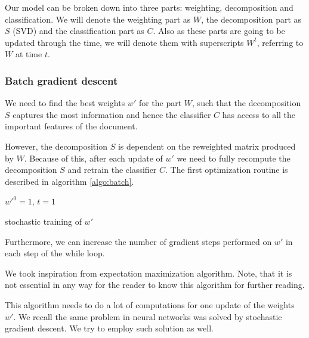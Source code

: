     Our model can be broken down into three parts: weighting, decomposition and classification.
    We will denote the weighting part as $W$, the decomposition part as $S$ (SVD) and the classification part as $C$.
    Also as these parts are going to be updated through the time, we will denote them with superscripts $W^t$, referring to $W$ at time $t$.
    
    
    \subsubsection{Batch gradient descent}
    
    We need to find the best weights $w'$ for the part $W$, 
    such that the decomposition $S$ captures the most information and hence the classifier $C$ has access to all the important features of the document.
    
    However, the decomposition $S$ is dependent on the reweighted matrix produced by $W$. 
    Because of this, after each update of $w'$ we need to fully recompute the decomposition $S$ and retrain the classifier $C$.
    The first optimization routine is described in algorithm \ref{algo:batch}.
    
    \medskip
    
    \begin{algorithm}[H]
        $w'^0 = 1$, $t=1$\;
        \caption{stochastic training of $w'$} \label{algo:batch}
    \end{algorithm}

    Furthermore, we can increase the number of gradient steps performed on $w'$ in each step of the while loop.
    
    We took inspiration from expectation maximization algorithm.  
    Note, that it is not essential in any way for the reader to know this algorithm for further reading.
    
    This algorithm needs to do a lot of computations for one update of the weights $w'$.
    We recall the same problem in neural networks was solved by stochastic gradient descent.
    We try to employ such solution as well.
    
